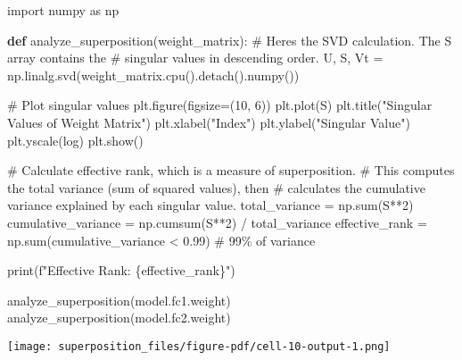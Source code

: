 \documentclass[
  letterpaper,
  DIV=11,
  numbers=noendperiod]{scrreprt}
\newenvironment{Shaded}{\begin{snugshade}}{\end{snugshade}}
\newcommand{\BuiltInTok}[1]{\textcolor[rgb]{0.00,0.23,0.31}{#1}}
\newcommand{\CommentTok}[1]{\textcolor[rgb]{0.37,0.37,0.37}{#1}}
\newcommand{\DecValTok}[1]{\textcolor[rgb]{0.68,0.00,0.00}{#1}}
\newcommand{\FloatTok}[1]{\textcolor[rgb]{0.68,0.00,0.00}{#1}}
\newcommand{\ImportTok}[1]{\textcolor[rgb]{0.00,0.46,0.62}{#1}}
\newcommand{\KeywordTok}[1]{\textcolor[rgb]{0.00,0.23,0.31}{\textbf{#1}}}
\newcommand{\NormalTok}[1]{\textcolor[rgb]{0.00,0.23,0.31}{#1}}
\newcommand{\OperatorTok}[1]{\textcolor[rgb]{0.37,0.37,0.37}{#1}}
\newcommand{\SpecialCharTok}[1]{\textcolor[rgb]{0.37,0.37,0.37}{#1}}
\newcommand{\SpecialStringTok}[1]{\textcolor[rgb]{0.13,0.47,0.30}{#1}}
\newcommand{\StringTok}[1]{\textcolor[rgb]{0.13,0.47,0.30}{#1}}
\begin{document}
\begin{Shaded}
\begin{Highlighting}[]
\ImportTok{import}\NormalTok{ numpy }\ImportTok{as}\NormalTok{ np}

\KeywordTok{def}\NormalTok{ analyze\_superposition(weight\_matrix):}
    \CommentTok{\# Here\textquotesingle{}s the SVD calculation. The \textquotesingle{}S\textquotesingle{} array contains the}
    \CommentTok{\# singular values in descending order.}
\NormalTok{    U, S, Vt }\OperatorTok{=}\NormalTok{ np.linalg.svd(weight\_matrix.cpu().detach().numpy())}

    \CommentTok{\# Plot singular values}
\NormalTok{    plt.figure(figsize}\OperatorTok{=}\NormalTok{(}\DecValTok{10}\NormalTok{, }\DecValTok{6}\NormalTok{))}
\NormalTok{    plt.plot(S)}
\NormalTok{    plt.title(}\StringTok{"Singular Values of Weight Matrix"}\NormalTok{)}
\NormalTok{    plt.xlabel(}\StringTok{"Index"}\NormalTok{)}
\NormalTok{    plt.ylabel(}\StringTok{"Singular Value"}\NormalTok{)}
\NormalTok{    plt.yscale(}\StringTok{\textquotesingle{}log\textquotesingle{}}\NormalTok{)}
\NormalTok{    plt.show()}

    \CommentTok{\# Calculate \textquotesingle{}effective rank\textquotesingle{}, which is a measure of superposition.}
    \CommentTok{\# This computes the total variance (sum of squared values), then}
    \CommentTok{\# calculates the cumulative variance explained by each singular value.}
\NormalTok{    total\_variance }\OperatorTok{=}\NormalTok{ np.}\BuiltInTok{sum}\NormalTok{(S}\OperatorTok{**}\DecValTok{2}\NormalTok{)}
\NormalTok{    cumulative\_variance }\OperatorTok{=}\NormalTok{ np.cumsum(S}\OperatorTok{**}\DecValTok{2}\NormalTok{) }\OperatorTok{/}\NormalTok{ total\_variance}
\NormalTok{    effective\_rank }\OperatorTok{=}\NormalTok{ np.}\BuiltInTok{sum}\NormalTok{(cumulative\_variance }\OperatorTok{\textless{}} \FloatTok{0.99}\NormalTok{)  }\CommentTok{\# 99\% of variance}

    \BuiltInTok{print}\NormalTok{(}\SpecialStringTok{f"Effective Rank: }\SpecialCharTok{\{}\NormalTok{effective\_rank}\SpecialCharTok{\}}\SpecialStringTok{"}\NormalTok{)}

\NormalTok{analyze\_superposition(model.fc1.weight)}
\NormalTok{analyze\_superposition(model.fc2.weight)}
\end{Highlighting}
\end{Shaded}

\texttt{[image: superposition\_files/figure-pdf/cell-10-output-1.png]}
\end{document}
